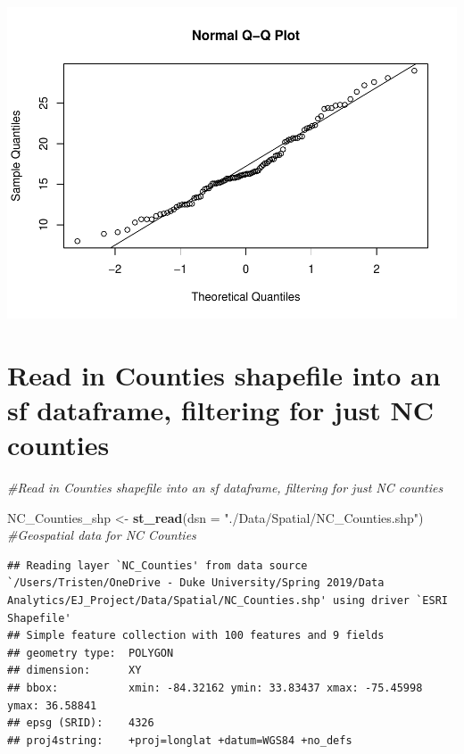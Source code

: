 \documentclass[12pt,]{article}
\newenvironment{Shaded}{\begin{snugshade}}{\end{snugshade}}
\newcommand{\KeywordTok}[1]{\textcolor[rgb]{0.13,0.29,0.53}{\textbf{#1}}}
\newcommand{\DataTypeTok}[1]{\textcolor[rgb]{0.13,0.29,0.53}{#1}}
\newcommand{\StringTok}[1]{\textcolor[rgb]{0.31,0.60,0.02}{#1}}
\newcommand{\CommentTok}[1]{\textcolor[rgb]{0.56,0.35,0.01}{\textit{#1}}}
\newcommand{\OperatorTok}[1]{\textcolor[rgb]{0.81,0.36,0.00}{\textbf{#1}}}
\newcommand{\NormalTok}[1]{#1}
\begin{document}
\begin{Shaded}
\end{Shaded}

\includegraphics{Project_Template_files/figure-latex/exploratory graphs-4.pdf}

\section{Read in Counties shapefile into an sf dataframe, filtering for
just NC
counties}\label{read-in-counties-shapefile-into-an-sf-dataframe-filtering-for-just-nc-counties}

\begin{Shaded}
\begin{Highlighting}[]
\CommentTok{#Read in Counties shapefile into an sf dataframe, filtering for just NC counties}

\NormalTok{NC_Counties_shp <-}\StringTok{ }\KeywordTok{st_read}\NormalTok{(}\DataTypeTok{dsn =} \StringTok{"./Data/Spatial/NC_Counties.shp"}\NormalTok{) }\CommentTok{#Geospatial data for NC Counties}
\end{Highlighting}
\end{Shaded}

\begin{verbatim}
## Reading layer `NC_Counties' from data source `/Users/Tristen/OneDrive - Duke University/Spring 2019/Data Analytics/EJ_Project/Data/Spatial/NC_Counties.shp' using driver `ESRI Shapefile'
## Simple feature collection with 100 features and 9 fields
## geometry type:  POLYGON
## dimension:      XY
## bbox:           xmin: -84.32162 ymin: 33.83437 xmax: -75.45998 ymax: 36.58841
## epsg (SRID):    4326
## proj4string:    +proj=longlat +datum=WGS84 +no_defs
\end{verbatim}
\end{document}
